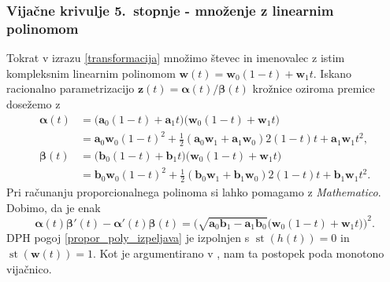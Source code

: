 \documentclass[12pt,a4paper,twoside]{article}
\theoremstyle{definition} %
\theoremstyle{plain} %
\numberwithin{equation}{section}  %
\newcommand{\aV}{\mathbf{a}}
\newcommand{\bV}{\mathbf{b}}
\newcommand{\wV}{\mathbf{w}}
\newcommand{\zV}{\mathbf{z}}
\newcommand{\balpha}{\boldsymbol \alpha}
\newcommand{\bbeta}{\boldsymbol \beta}
\DeclareMathOperator{\st}{st}
\begin{document}
\subsubsection{Vijačne krivulje 5.\ stopnje - množenje z linearnim polinomom}
\label{mnozenje_linearni_polinom_5}

Tokrat v izrazu \eqref{transformacija} množimo števec in imenovalec z istim kompleksnim linearnim polinomom $\wV(t)=\wV_0(1-t)+\wV_1t.$ Iskano racionalno parametrizacijo $\zV(t)=\balpha(t)/\bbeta(t)$ krožnice oziroma premice dosežemo z
\begin{align*}
	\balpha(t)&=\big(\aV_0(1-t)+\aV_1t\big)\big(\wV_0(1-t)+\wV_1t\big)\\
	&=\aV_0\wV_0(1-t)^2+\frac{1}{2}(\aV_0\wV_1+\aV_1\wV_0)2(1-t)t+\aV_1\wV_1t^2,\\
	\bbeta(t)&=\big(\bV_0(1-t)+\bV_1t\big)\big(\wV_0(1-t)+\wV_1t\big)\\
	&=\bV_0\wV_0(1-t)^2+\frac{1}{2}(\bV_0\wV_1+\bV_1\wV_0)2(1-t)t+\bV_1\wV_1t^2.
\end{align*}
Pri računanju proporcionalnega polinoma si lahko pomagamo z \emph{Mathematico}. Dobimo, da je enak
\begin{equation*}
	\balpha(t)\bbeta'(t)-\balpha'(t)\bbeta(t)=\big(\sqrt{\aV_0\bV_1-\aV_1\bV_0}\big(\wV_0(1-t)+\wV_1t\big)\big)^2.
\end{equation*}
DPH pogoj \eqref{propor_poly_izpeljava} je izpolnjen s $\st(h(t))=0$ in $\st(\wV(t))=1.$ Kot je argumentirano v \cite{beltranmonterde}, nam ta postopek poda monotono vijačnico.
\end{document}

